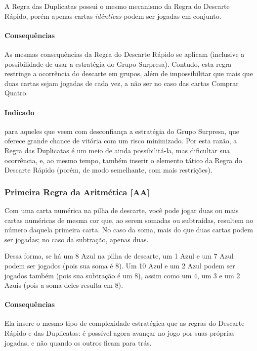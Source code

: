 A Regra das Duplicatas possui o mesmo mecanismo da Regra do Descarte Rápido, porém apenas cartas \emph{idênticas} podem ser jogadas em conjunto.

\paragraph{Consequências}

As mesmas consequências da Regra do Descarte Rápido se aplicam (inclusive a possibilidade de usar a estratégia do Grupo Surpresa). Contudo, esta regra restringe a ocorrência do descarte em grupos, além de impossibilitar que mais que duas cartas sejam jogadas de cada vez, a não ser no caso das cartas Comprar Quatro.

\paragraph{Indicado} 

para aqueles que veem com desconfiança a estratégia do Grupo Surpresa, que oferece grande chance de vitória com um risco minimizado. Por esta razão, a Regra das Duplicatas é um meio de ainda possibilitá-la, mas dificultar sua ocorrência, e, ao mesmo tempo, também inserir o elemento tático da Regra do Descarte Rápido (porém, de modo semelhante, com mais restrições).

\subsubsection{Primeira Regra da Aritmética [AA]}

Com uma carta numérica na pilha de descarte, você pode jogar duas ou mais cartas numéricas de mesma cor que, ao serem somadas ou subtraídas, resultem no número daquela primeira carta. No caso da soma, mais do que duas cartas podem ser jogadas; no caso da subtração, apenas duas.

Dessa forma, se há um 8 Azul na pilha de descarte, um 1 Azul e um 7 Azul podem ser jogados (pois sua soma é 8). Um 10 Azul e um 2 Azul podem ser jogados também (pois sua subtração é um 8), assim como um 4, um 3 e um 2 Azuis (pois a soma deles resulta em 8).

\paragraph{Consequências}

Ela insere o mesmo tipo de complexidade estratégica que as regras do Descarte Rápido e das Duplicatas: é possível agora avançar no jogo por suas próprias jogadas, e não quando os outros ficam para trás.

